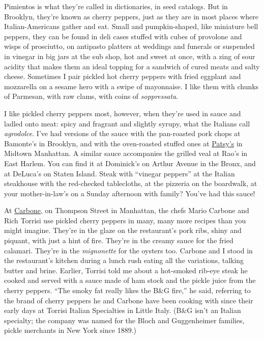 Pimientos is what they're called in dictionaries, in seed catalogs. But
in Brooklyn, they're known as cherry peppers, just as they are in most
places where Italian-Americans gather and eat. Small and pumpkin-shaped,
like miniature bell peppers, they can be found in deli cases stuffed
with cubes of provolone and wisps of prosciutto, on antipasto platters
at weddings and funerals or suspended in vinegar in big jars at the sub
shop, hot and sweet at once, with a zing of sour acidity that makes them
an ideal topping for a sandwich of cured meats and salty cheese.
Sometimes I pair pickled hot cherry peppers with fried eggplant and
mozzarella on a sesame hero with a swipe of mayonnaise. I like them with
chunks of Parmesan, with raw clams, with coins of \emph{soppressata}.

I like pickled cherry peppers most, however, when they're used in sauce
and ladled onto meat: spicy and fragrant and slightly syrupy, what the
Italians call \emph{agrodolce}. I've had versions of the sauce with the
pan-roasted pork chops at Bamonte's in Brooklyn, and with the
oven-roasted stuffed ones at
\href{https://www.nytimes3xbfgragh.onion/2019/09/25/style/patsys-a-rat-pack-redoubt-turns-75.html}{Patsy's}
in Midtown Manhattan. A similar sauce accompanies the grilled veal at
Rao's in East Harlem. You can find it at Dominick's on Arthur Avenue in
the Bronx, and at DeLuca's on Staten Island. Steak with ``vinegar
peppers'' at the Italian steakhouse with the red-checked tablecloths, at
the pizzeria on the boardwalk, at your mother-in-law's on a Sunday
afternoon with family? You've had this sauce!

At
\href{https://www.nytimes3xbfgragh.onion/2013/06/05/dining/reviews/restaurant-review-carbone-in-manhattan.html}{Carbone},
on Thompson Street in Manhattan, the chefs Mario Carbone and Rich
Torrisi use pickled cherry peppers in many, many more recipes than you
might imagine. They're in the glaze on the restaurant's pork ribs, shiny
and piquant, with just a hint of fire. They're in the creamy sauce for
the fried calamari. They're in the \emph{mignonette} for the oysters
too. Carbone and I stood in the restaurant's kitchen during a lunch rush
eating all the variations, talking butter and brine. Earlier, Torrisi
told me about a hot-smoked rib-eye steak he cooked and served with a
sauce made of ham stock and the pickle juice from the cherry peppers.
``The smoky fat really likes the B\&G fire,'' he said, referring to the
brand of cherry peppers he and Carbone have been cooking with since
their early days at Torrisi Italian Specialties in Little Italy. (B\&G
isn't an Italian specialty; the company was named for the Bloch and
Guggenheimer families, pickle merchants in New York since 1889.)

